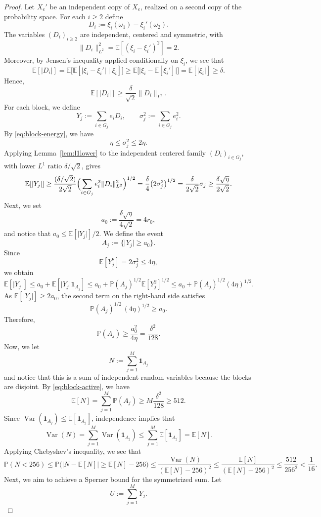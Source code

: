 \documentclass[11pt]{amsart}
\numberwithin{equation}{section}
\theoremstyle{definition}
\theoremstyle{remark}
\newcommand{\E}{\mathbb E}
\newcommand{\Prob}{\mathbb P}
\newcommand{\abs}[1]{\lvert #1 \rvert}
\newcommand{\norm}[1]{\lVert #1 \rVert}
\begin{document}
\begin{proof}
 Let $X_e'$ be an independent copy of $X_e$, realized on a second copy of the
probability space.  For each $i\ge2$ define
\[
D_i:=\xi_i(\omega_1)-\xi_i'(\omega_2).
\]
The variables $(D_i)_{i\ge2}$ are independent, centered and symmetric,
with
\[
\norm{D_i}_{L^2}^2
=\E[(\xi_i-\xi_i')^2]
=2.
\]
Moreover, by Jensen's inequality applied conditionally on $\xi_i$, we see that
\[
\E[\abs{D_i}]
=\E\bigl[\E[\abs{\xi_i-\xi_i'}\mid \xi_i]\bigr]
\ge \E\bigl[\abs{\xi_i-\E[\xi_i']} \bigr]
=\E[\abs{\xi_i}]
\ge \delta.
\]
Hence,
\[
\E[\abs{D_i}]
\ge \frac{\delta}{\sqrt2}\norm{D_i}_{L^2}.
\]
For each block, we define
\[
Y_j:=\sum_{i\in G_j} e_iD_i,
\qquad
\sigma_j^2:=\sum_{i\in G_j} e_i^2.
\]
By \eqref{eq:block-energy}, we have
\[
\eta\le \sigma_j^2\le 2\eta.
\]
Applying Lemma~\ref{lem:l1lower} to the independent centered family
$(D_i)_{i\in G_j}$, with lower $L^1$ ratio $\delta/\sqrt2$, gives
\[
\E[\abs{Y_j}]
\ge
\frac{(\delta/\sqrt2)}{2\sqrt2}
\Bigl(\sum_{i\in G_j} e_i^2\norm{D_i}_{L^2}^2\Bigr)^{1/2}
=\frac{\delta}{4}\bigl(2\sigma_j^2\bigr)^{1/2}
=\frac{\delta}{2\sqrt{2}}\sigma_j
\ge \frac{\delta\sqrt{\eta}}{2\sqrt{2}}.
\]
Next, we set
\[
a_0:=\frac{\delta\sqrt{\eta}}{4\sqrt{2}}=4r_0,
\]
and notice that $a_0\le \E[\abs{Y_j}]/2$.  We define the event 
\[
A_j:=\{\abs{Y_j}\ge a_0\}.
\]
Since
\[
\E[Y_j^2]=2\sigma_j^2\le 4\eta,
\]
we obtain
\[
\E[\abs{Y_j}]
\le a_0+\E[\abs{Y_j}\mathbf 1_{A_j}]
\le a_0+\Prob(A_j)^{1/2}\E[Y_j^2]^{1/2}\le a_0 +\Prob(A_j)^{1/2}(4\eta)^{1/2} .
\]
As $\E[\abs{Y_j}]\ge 2a_0$, the second term on the right-hand side satisfies
\[
\Prob(A_j)^{1/2}\,(4\eta)^{1/2}\ge a_0.
\]
Therefore,
\begin{equation}\label{eq:block-active}
\Prob(A_j)\ge \frac{a_0^2}{4\eta}=\frac{\delta^2}{128}.
\end{equation}
Now, we let
\[
N:=\sum_{j=1}^M \mathbf 1_{A_j}
\]
and notice that this is a sum of independent random variables because the blocks are
disjoint.  By \eqref{eq:block-active}, we have
\[
\E[N]
=\sum_{j=1}^M \Prob(A_j)
\ge M\frac{\delta^2}{128}
\ge 512.
\]
Since $\operatorname{Var}(\mathbf 1_{A_j})\le \E[\mathbf 1_{A_j}]$, independence implies that
\[
\operatorname{Var}(N) = \sum_{j=1}^M \operatorname{Var}(\mathbf 1_{A_j})\le \sum_{j=1}^M \E[\mathbf 1_{A_j}]=  \E[N].
\]
Applying Chebyshev's inequality, we see that
\[
\Prob(N<256)
\le
\Prob\bigl(\abs{N-\E[N]}\ge \E[N]-256\bigr)
\le
\frac{\operatorname{Var}(N)}{(\E[N]-256)^2}
\le
\frac{\E[N]}{(\E[N]-256)^2}
\le \frac{512}{256^2}
<\frac1{16}.
\]
 Next, we aim to achieve a Sperner bound for the symmetrized sum.
Let
\[
U:=\sum_{j=1}^M Y_j.
\]

\end{proof}
\end{document}
